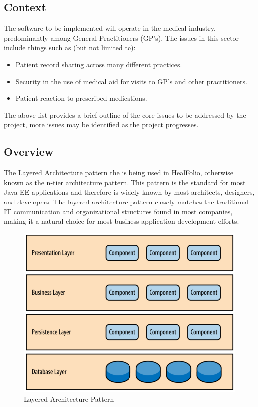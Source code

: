 \documentclass[10pt,oneside]{report}
\begin{document}
\subsection{Context}


The software to be implemented will operate in the medical industry, predominantly among General Practitioners (GP's). The issues in this sector include things such as (but not limited to):

\begin{itemize}

\item Patient record sharing across many different practices.

\item Security in the use of medical aid for visits to GP's and other practitioners.

\item Patient reaction to prescribed medications.

\end{itemize}

The above list provides a brief outline of the core issues to be addressed by the project, more issues may be identified as the project progresses.

\subsection{Overview}

The Layered Architecture pattern the is being used in HealFolio, otherwise known as the n-tier architecture pattern. This pattern is the standard for most Java EE applications and therefore is widely known by most architects, designers, and developers. The layered architecture pattern closely matches the traditional IT communication and organizational structures found in most companies, making it a natural choice for most business application development efforts.

\begin{figure}[h!]
\includegraphics[width=15cm]{Layered-architecture-pattern.png}
\caption{Layered Architecture Pattern}
\label{Layered Architecture Pattern}
\end{figure}
\end{document}
